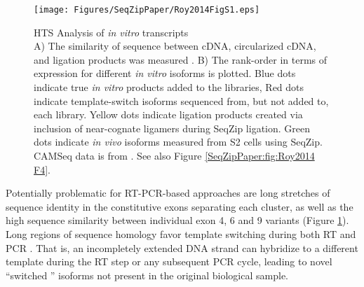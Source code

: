 		\begin{figure} %
			\centering 
			\texttt{[image: Figures/SeqZipPaper/Roy2014FigS1.eps]}
			\caption[HTS Analysis of \dscam{} \textit{in vitro} transcripts]
			{
				HTS Analysis of \dscam{} \textit{in vitro} transcripts\\[0.25cm]
				 A) The similarity of sequence between cDNA, circularized cDNA, and ligation products was measured \citep{Waterhouse2009,Notredame2000}. B) The rank-order in terms of expression for different \textit{in vitro} \dscam{} isoforms is plotted. Blue dots indicate true \textit{in vitro} products added to the libraries, Red dots indicate template-switch isoforms sequenced from, but not added to, each library. Yellow dots indicate ligation products created via inclusion of near-cognate ligamers during SeqZip ligation. Green dots indicate \textit{in vivo} isoforms measured from S2 cells using SeqZip. CAMSeq data is from \citep{Sun2013}. See also Figure \ref{SeqZipPaper:fig:Roy2014 F4}.
				}
			\label{SeqZipPaper:fig:Roy2014 S1}
			\end{figure}

		Potentially problematic for RT-PCR-based approaches are long stretches of sequence identity in the constitutive exons separating each cluster, as well as the high sequence similarity between individual exon 4, 6 and 9 variants (Figure \ref{SeqZipPaper:fig:Roy2014 S1}). Long regions of sequence homology favor template switching during both RT and PCR \citep{Houseley2010a,Judo1998}. That is, an incompletely extended DNA strand can hybridize to a different template during the RT step or any subsequent PCR cycle, leading to novel ``switched '' isoforms not present in the original biological sample.

